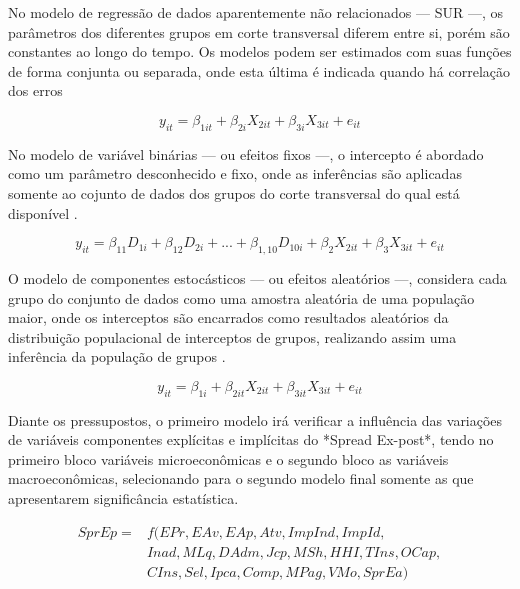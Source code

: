 \documentclass[
  12pt,
  12pt,
  openright,
  oneside,
  a4paper,
  chapter=TITLE,
  section=TITLE,
  subsection=TITLE,
  subsubsection=TITLE,
  english,
  portugues,
  sumario=tradicional]{abntex2}
\begin{document}
\begin{apendicesenv}
No modelo de regressão de dados aparentemente não relacionados — SUR —, os parâmetros dos diferentes grupos em corte transversal diferem entre si, porém são constantes ao longo do tempo. Os modelos podem ser estimados com suas funções de forma conjunta ou separada, onde esta última é indicada quando há correlação dos erros \cite{hill:2010}

\begin{equation}
y_{it} = \beta_{1it} + \beta_{2i}X_{2it} + \beta_{3i}X_{3it} + e_{it}
\end{equation}

\vspace{20pt}

No modelo de variável binárias — ou efeitos fixos —, o intercepto é abordado como um parâmetro desconhecido e fixo, onde as inferências são aplicadas somente ao cojunto de dados dos grupos do corte transversal do qual está disponível \cite{hill:2010}. 

\begin{equation}
y_{it} = \beta_{11}D_{1i} + \beta_{12}D_{2i} + ... + \beta_{1,10}D_{10i} + \beta_{2}X_{2it} + \beta_{3}X_{3it} + e_{it}
\end{equation}

\vspace{20pt}

O modelo de componentes estocásticos — ou efeitos aleatórios —, considera cada grupo do conjunto de dados como uma amostra aleatória de uma população maior, onde os interceptos são encarrados como resultados aleatórios da distribuição populacional de interceptos de grupos, realizando assim uma inferência da população de grupos \cite{hill:2010}.

\begin{equation}
y_{it} = \beta_{1i} + \beta_{2it}X_{2it} + \beta_{3it}X_{3it} + e_{it}
\end{equation}

Diante os pressupostos, o primeiro modelo irá verificar a influência das variações de variáveis componentes explícitas e implícitas do  *Spread Ex-post*, tendo no primeiro bloco variáveis microeconômicas e o segundo bloco as variáveis macroeconômicas, selecionando para o segundo modelo final somente as que apresentarem significância estatística.

\begin{equation}
\begin{aligned}
SprEp = &f(EPr, EAv, EAp, Atv, ImpInd, ImpId, \\ 
& Inad, MLq, DAdm, Jcp, MSh, HHI, TIns, OCap, \\ 
& CIns, Sel, Ipca, Comp, MPag, VMo, SprEa)
\end{aligned}
\end{equation}


\end{apendicesenv}
\end{document}
